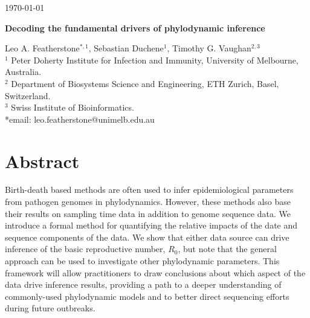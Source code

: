 \documentclass{article}
\begin{document}
\begin{flushright}
\today
\end{flushright}
\begin{center}
\begin{LARGE}
    \textbf{Decoding the fundamental drivers of phylodynamic inference}
\end{LARGE}
\end{center}
Leo A. Featherstone$^{\ast,1}$, Sebastian Duchene$^1$, Timothy G. Vaughan$^{2,3}$\\
$^{1}$ Peter Doherty Institute for Infection and Immunity, University of Melbourne, Australia.\\
$^{2}$ Department of Biosystems Science and Engineering, ETH Zurich, Basel, Switzerland.\\
$^{3}$  Swiss Institute of Bioinformatics.\\
*email: leo.featherstone@unimelb.edu.au
\section*{Abstract}
Birth-death based methods are often used to infer epidemiological parameters from pathogen genomes in phylodynamics.
However, these methods also base their results on sampling time data in addition to genome sequence data.
We introduce a formal method for quantifying the relative impacts of the date and sequence components of the data.
We show that either data source can drive inference of the basic reproductive number, $R_0$, but note that the general approach can be used to investigate other phylodynamic parameters. This framework will allow practitioners to draw conclusions about which aspect of the data drive inference results, providing a path to a deeper understanding of commonly-used phylodynamic models and to better direct sequencing efforts during future outbreaks.
\end{document}

